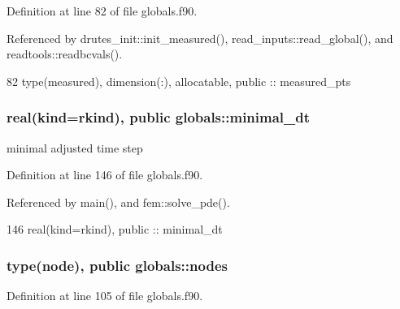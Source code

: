 Definition at line 82 of file globals.\+f90.



Referenced by drutes\+\_\+init\+::init\+\_\+measured(), read\+\_\+inputs\+::read\+\_\+global(), and readtools\+::readbcvals().


\begin{DoxyCode}
82   \textcolor{keywordtype}{type}(measured), \textcolor{keywordtype}{dimension(:)}, \textcolor{keywordtype}{allocatable}, \textcolor{keywordtype}{public} :: measured_pts
\end{DoxyCode}
\subsubsection[{minimal\+\_\+dt}]{\setlength{\rightskip}{0pt plus 5cm}real(kind=rkind), public globals\+::minimal\+\_\+dt}\label{namespaceglobals_a27b58eb7dc03899591de12275bd61fd7}


minimal adjusted time step 



Definition at line 146 of file globals.\+f90.



Referenced by main(), and fem\+::solve\+\_\+pde().


\begin{DoxyCode}
146   \textcolor{keywordtype}{real(kind=rkind)}, \textcolor{keywordtype}{public} :: minimal_dt
\end{DoxyCode}
\subsubsection[{nodes}]{\setlength{\rightskip}{0pt plus 5cm}type({\bf node}), public globals\+::nodes}\label{namespaceglobals_a3e4ae1cd4085ab497e8b6f1890326d4f}


Definition at line 105 of file globals.\+f90.



